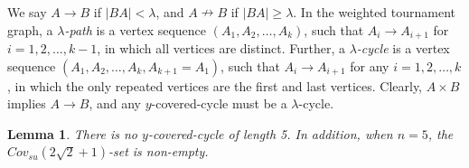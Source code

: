 \documentclass[11pt]{article}
\newtheorem{lemma}[theorem]{Lemma}
\theoremstyle{remark}
\begin{document}
  We say $A\rightarrow B$ if $|BA|< \lambda$, and $A\nrightarrow B$ if $|BA|\ge \lambda$.  In the weighted tournament graph, a \emph{$\lambda$-path} is a vertex sequence $(A_1,A_2,\ldots,A_k)$, such that $A_i\rightarrow A_{i+1}$ for $i=1,2,\ldots,k-1$, in which all vertices are distinct.  Further, a \emph{$\lambda$-cycle} is a vertex sequence $(A_1,A_2,\ldots,A_k,A_{k+1}=A_1)$, such that $A_i\rightarrow A_{i+1}$ for any $i=1,2,\ldots,k$,  in which the only repeated vertices are the first and last vertices. Clearly, $A\times B$ implies $A\rightarrow B$, and any $y$-covered-cycle must be a $\lambda$-cycle.


\begin{lemma}\label{lem:n5}
There is no $y$-covered-cycle of length 5.  In addition, when $n=5$, the $Cov_{su}(2\sqrt2+1)$-set is non-empty.
 \end{lemma}
\end{document}
